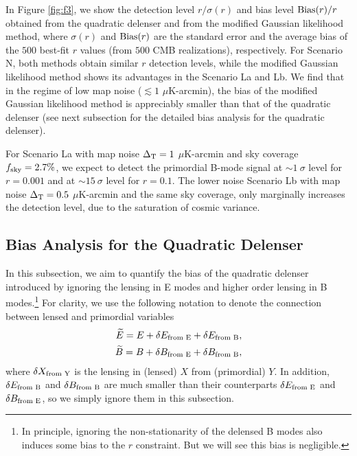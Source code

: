 \documentclass[aps, prd, reprint, nofootinbib, groupedaddress, showpacs]{revtex4-1}
\def\be{\begin{equation}}
\def\ee{\end{equation}}
\begin{document}
In Figure \ref{fig:f3}, we show the detection level $r/\sigma(r)$
and bias level ${\rm Bias}(r)/r$ obtained from the quadratic delenser
and from the modified Gaussian likelihood method,
where $\sigma(r)$ and ${\rm Bias}(r)$ are the standard error and
the average bias of the $500$ best-fit $r$ values (from $500$ CMB realizations), respectively.
For Scenario N, both methods  obtain  similar $r$ detection levels,
while the modified Gaussian likelihood method shows its advantages in the
Scenario La and Lb.
We find that in the regime of low map noise  ($\lesssim 1$ $\mu$K-arcmin),
the bias of the modified Gaussian likelihood method is appreciably smaller than
that of the quadratic delenser (see next subsection for the detailed bias analysis
for the quadratic delenser).

For Scenario La with map noise $\Delta_{\rm T} = 1$ $\mu$K-arcmin and
sky coverage $f_{\rm sky} = 2.7\%$, we expect to detect the primordial B-mode signal at
$\sim 1\ \sigma$ level for $r = 0.001$ and at $\sim 15 \ \sigma$ level for $r = 0.1$.
The lower noise Scenario Lb with map noise $\Delta_{\rm T} = 0.5$ $\mu$K-arcmin
and the same sky coverage, only marginally increases the detection level,
due to the saturation of cosmic variance.

\subsection{Bias Analysis for the Quadratic Delenser}
\label{sec:app4}
In this subsection, we aim to quantify the bias of the quadratic delenser
introduced by ignoring the lensing in E modes and higher order lensing in
B modes.\footnote{ In principle, ignoring the non-stationarity of the delensed B modes also induces
some bias to the $r$ constraint. But we will see this bias is negligible. }
For clarity, we use the following notation to denote
the connection between lensed and primordial variables
\be
\begin{aligned}
\widetilde E = E + \delta E_{\text{\rm from E}} + \delta E_{\text{\rm from B}} , \\
\widetilde B = B + \delta B_{\text{\rm from E}} + \delta B_{\text{\rm from B}} ,
\end{aligned}
\ee
where $\delta X_{\text{\rm from Y}}$ is the lensing in (lensed) $X$ from  (primordial) $Y$.
In addition, $\delta E_{\text{\rm from B}}$ and $\delta B_{\text{\rm from B}}$ are much smaller
than their counterparts $\delta E_{\text{\rm from E}} $ and $\delta B_{\text{\rm from E}}$, so we simply ignore them
in this subsection.
\end{document}
